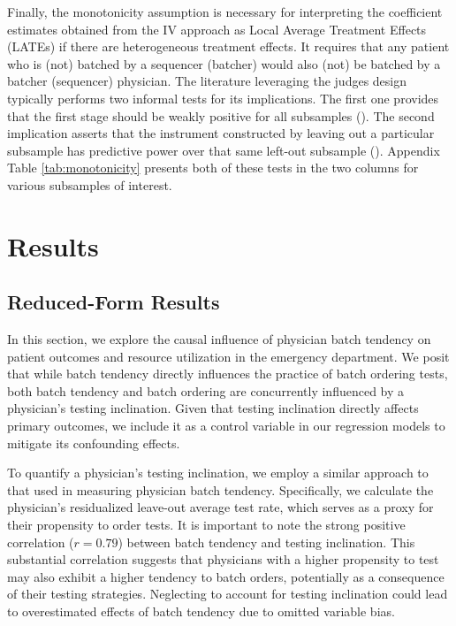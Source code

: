 \documentclass[,,nonblindrev]{informs}
\begin{document}
Finally, the monotonicity assumption is necessary for interpreting the
coefficient estimates obtained from the IV approach as Local Average
Treatment Effects (LATEs) if there are heterogeneous treatment effects.
It requires that any patient who is (not) batched by a sequencer
(batcher) would also (not) be batched by a batcher (sequencer)
physician. The literature leveraging the judges design typically
performs two informal tests for its implications. The first one provides
that the first stage should be weakly positive for all subsamples
(\citet{dobbie2018effects}). The second implication asserts that the
instrument constructed by leaving out a particular subsample has
predictive power over that same left-out subsample
(\citet{bhuller2020incarceration}). Appendix Table
\ref{tab:monotonicity} presents both of these tests in the two columns
for various subsamples of interest.

\hypertarget{sec:4}{%
\section{Results}\label{sec:4}}

\hypertarget{reduced-form-results}{%
\subsection{Reduced-Form Results}\label{reduced-form-results}}

In this section, we explore the causal influence of physician batch
tendency on patient outcomes and resource utilization in the emergency
department. We posit that while batch tendency directly influences the
practice of batch ordering tests, both batch tendency and batch ordering
are concurrently influenced by a physician's testing inclination. Given
that testing inclination directly affects primary outcomes, we include
it as a control variable in our regression models to mitigate its
confounding effects.

To quantify a physician's testing inclination, we employ a similar
approach to that used in measuring physician batch tendency.
Specifically, we calculate the physician's residualized leave-out
average test rate, which serves as a proxy for their propensity to order
tests. It is important to note the strong positive correlation
(\(r = 0.79\)) between batch tendency and testing inclination. This
substantial correlation suggests that physicians with a higher
propensity to test may also exhibit a higher tendency to batch orders,
potentially as a consequence of their testing strategies. Neglecting to
account for testing inclination could lead to overestimated effects of
batch tendency due to omitted variable bias.
\end{document}
